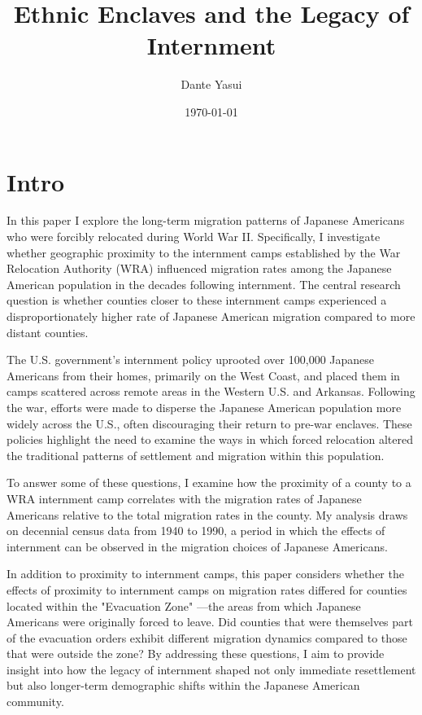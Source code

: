 \documentclass[12pt]{article}
\title{Ethnic Enclaves and the Legacy of Internment}
\author{Dante Yasui}
\date{\today}
\begin{document}


\maketitle

\section{Intro}\label{intro}


In this paper I explore the long-term migration patterns of Japanese Americans 
who were forcibly relocated during World War II.
Specifically, I investigate whether geographic proximity to the internment camps 
established by the War Relocation Authority (WRA)
influenced migration rates among the Japanese American population 
in the decades following internment.
The central research question is
whether counties closer to these internment camps experienced a disproportionately higher rate of Japanese American migration compared to more distant counties.

The U.S. government’s internment policy uprooted over 100,000 Japanese Americans from their homes, 
primarily on the West Coast,
and placed them in camps scattered across remote areas in the Western U.S. and Arkansas.
Following the war, 
efforts were made to disperse the Japanese American population more widely across the U.S.,
often discouraging their return to pre-war enclaves.
These policies highlight the need to examine the ways in which
forced relocation altered the traditional patterns of settlement 
and migration within this population.

To answer some of these questions, 
I examine how the proximity of a county to a WRA internment camp correlates with the migration rates of Japanese Americans 
relative to the total migration rates in the county.
My analysis draws on decennial census data from 1940 to 1990,
a period in which the effects of internment 
can be observed in the migration choices of Japanese Americans.

In addition to proximity to internment camps,
this paper considers whether the effects of proximity to internment camps on migration rates 
differed for counties located within the "Evacuation Zone"
—the areas from which Japanese Americans were originally forced to leave.
Did counties that were themselves part of the evacuation orders 
exhibit different migration dynamics compared to those that were outside the zone?
By addressing these questions, I aim to provide insight into how the legacy of internment shaped not only immediate resettlement 
but also longer-term demographic shifts within the Japanese American community.
\end{document}
